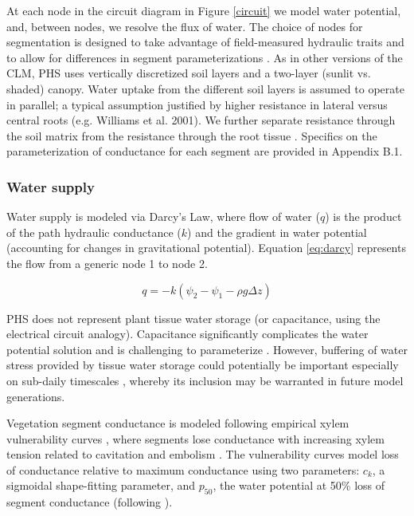 \documentclass[draft,linenumbers]{agujournal}
\begin{document}
  At each node in the circuit diagram in Figure \ref{circuit} we model water potential, and, between nodes, we resolve the flux of water. The choice of nodes for segmentation is designed to take advantage of field-measured hydraulic traits and to allow for differences in segment parameterizations \citep{simonin2015, sperry2015}. As in other versions of the CLM,  PHS uses vertically discretized soil layers and a two-layer (sunlit vs. shaded) canopy.  Water uptake from the different soil layers is assumed to operate in parallel;  a typical assumption justified by higher resistance in lateral versus central roots (e.g. Williams et al. 2001). We further separate resistance through the soil matrix from the resistance through the root tissue \citep{williams1996}. 
  Specifics on the parameterization of conductance for each segment are provided in Appendix B.1.

    \subsubsection{Water supply}
    \label{sect:supply}
    Water supply is modeled via Darcy's Law, where flow of water ($q$) is the product of the path hydraulic conductance ($k$) and the gradient in water potential (accounting for changes in gravitational potential).  Equation \ref{eq:darcy} represents the flow from a generic node 1 to node 2. 
    
     \begin{linenomath*}
     \begin{equation}
     \label{eq:darcy}
     q = -k\left(\psi_2 - \psi_1 - \rho g \Delta z\right)
     \end{equation}
     \end{linenomath*}
    
    PHS does not represent plant tissue water storage (or capacitance, using the electrical circuit analogy).  Capacitance significantly complicates the water potential solution \citep{celia1990} and is challenging to parameterize \citep{bartlett2016}. However, buffering of water stress provided by tissue water storage could potentially be important especially on sub-daily timescales \citep{meinzer2009,epila2017}, whereby its inclusion may be warranted in future model generations.

     Vegetation segment conductance is modeled following empirical xylem vulnerability curves \citep{tyree1989}, where segments lose conductance with increasing xylem tension related to cavitation and embolism \citep{holbrook2001}. The vulnerability curves model loss of conductance relative to maximum conductance using two parameters: $c_k$, a sigmoidal shape-fitting parameter, and $p_{50}$, the water potential at 50\% loss of segment conductance (following \cite{gentine2016}). 
     
\end{document}
